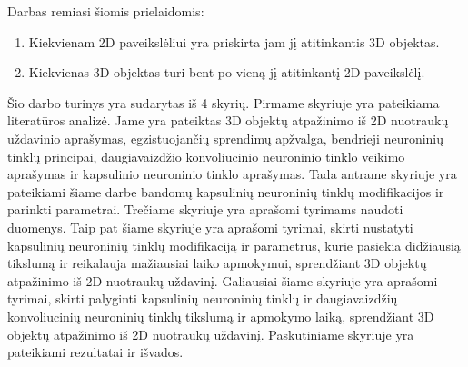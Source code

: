 Darbas remiasi šiomis prielaidomis:

\begin{enumerate}
	\item Kiekvienam 2D paveikslėliui yra priskirta jam jį atitinkantis 3D objektas.
	\item Kiekvienas 3D objektas turi bent po vieną jį atitinkantį 2D paveikslėlį.
\end{enumerate}

Šio darbo turinys yra sudarytas iš 4 skyrių. Pirmame skyriuje yra pateikiama literatūros analizė. Jame yra pateiktas 3D objektų atpažinimo iš 2D nuotraukų uždavinio aprašymas, egzistuojančių sprendimų apžvalga, bendrieji neuroninių tinklų principai, daugiavaizdžio konvoliucinio neuroninio tinklo veikimo aprašymas ir kapsulinio neuroninio tinklo aprašymas.
Tada antrame skyriuje yra pateikiami šiame darbe bandomų kapsulinių neuroninių tinklų modifikacijos ir parinkti parametrai.
Trečiame skyriuje yra aprašomi tyrimams naudoti duomenys.
Taip pat šiame skyriuje yra aprašomi tyrimai, skirti nustatyti kapsulinių neuroninių tinklų modifikaciją ir parametrus, kurie pasiekia didžiausią tikslumą ir reikalauja mažiausiai laiko apmokymui, sprendžiant 3D objektų atpažinimo iš 2D nuotraukų uždavinį.
Galiausiai šiame skyriuje yra aprašomi tyrimai, skirti palyginti kapsulinių neuroninių tinklų ir daugiavaizdžių konvoliucinių neuroninių tinklų tikslumą ir apmokymo laiką, sprendžiant 3D objektų atpažinimo iš 2D nuotraukų uždavinį.
Paskutiniame skyriuje yra pateikiami rezultatai ir išvados.
